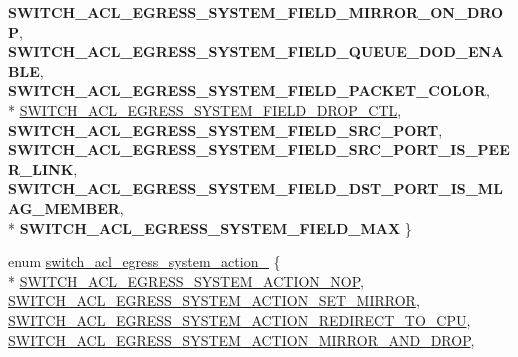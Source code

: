 \begin{DoxyCompactItemize}
{\bfseries S\+W\+I\+T\+C\+H\+\_\+\+A\+C\+L\+\_\+\+E\+G\+R\+E\+S\+S\+\_\+\+S\+Y\+S\+T\+E\+M\+\_\+\+F\+I\+E\+L\+D\+\_\+\+M\+I\+R\+R\+O\+R\+\_\+\+O\+N\+\_\+\+D\+R\+O\+P}, 
{\bfseries S\+W\+I\+T\+C\+H\+\_\+\+A\+C\+L\+\_\+\+E\+G\+R\+E\+S\+S\+\_\+\+S\+Y\+S\+T\+E\+M\+\_\+\+F\+I\+E\+L\+D\+\_\+\+Q\+U\+E\+U\+E\+\_\+\+D\+O\+D\+\_\+\+E\+N\+A\+B\+L\+E}, 
{\bfseries S\+W\+I\+T\+C\+H\+\_\+\+A\+C\+L\+\_\+\+E\+G\+R\+E\+S\+S\+\_\+\+S\+Y\+S\+T\+E\+M\+\_\+\+F\+I\+E\+L\+D\+\_\+\+P\+A\+C\+K\+E\+T\+\_\+\+C\+O\+L\+O\+R}, 
\\*
\hyperlink{group__ACL_gga2edc038cd515df04ca1426513fef2cf0ab4b0d1b005afcb0d88af06b4027ad741}{S\+W\+I\+T\+C\+H\+\_\+\+A\+C\+L\+\_\+\+E\+G\+R\+E\+S\+S\+\_\+\+S\+Y\+S\+T\+E\+M\+\_\+\+F\+I\+E\+L\+D\+\_\+\+D\+R\+O\+P\+\_\+\+C\+T\+L}, 
{\bfseries S\+W\+I\+T\+C\+H\+\_\+\+A\+C\+L\+\_\+\+E\+G\+R\+E\+S\+S\+\_\+\+S\+Y\+S\+T\+E\+M\+\_\+\+F\+I\+E\+L\+D\+\_\+\+S\+R\+C\+\_\+\+P\+O\+R\+T}, 
{\bfseries S\+W\+I\+T\+C\+H\+\_\+\+A\+C\+L\+\_\+\+E\+G\+R\+E\+S\+S\+\_\+\+S\+Y\+S\+T\+E\+M\+\_\+\+F\+I\+E\+L\+D\+\_\+\+S\+R\+C\+\_\+\+P\+O\+R\+T\+\_\+\+I\+S\+\_\+\+P\+E\+E\+R\+\_\+\+L\+I\+N\+K}, 
{\bfseries S\+W\+I\+T\+C\+H\+\_\+\+A\+C\+L\+\_\+\+E\+G\+R\+E\+S\+S\+\_\+\+S\+Y\+S\+T\+E\+M\+\_\+\+F\+I\+E\+L\+D\+\_\+\+D\+S\+T\+\_\+\+P\+O\+R\+T\+\_\+\+I\+S\+\_\+\+M\+L\+A\+G\+\_\+\+M\+E\+M\+B\+E\+R}, 
\\*
{\bfseries S\+W\+I\+T\+C\+H\+\_\+\+A\+C\+L\+\_\+\+E\+G\+R\+E\+S\+S\+\_\+\+S\+Y\+S\+T\+E\+M\+\_\+\+F\+I\+E\+L\+D\+\_\+\+M\+A\+X}
 \}
\item 
enum \hyperlink{group__ACL_ga3f3d6a633ebb6283aad6b971ec96333d}{switch\+\_\+acl\+\_\+egress\+\_\+system\+\_\+action\+\_\+} \{ \\*
\hyperlink{group__ACL_gga3f3d6a633ebb6283aad6b971ec96333dab36d5f148caa50ce3a0c8f335fb9ee1c}{S\+W\+I\+T\+C\+H\+\_\+\+A\+C\+L\+\_\+\+E\+G\+R\+E\+S\+S\+\_\+\+S\+Y\+S\+T\+E\+M\+\_\+\+A\+C\+T\+I\+O\+N\+\_\+\+N\+O\+P}, 
\hyperlink{group__ACL_gga3f3d6a633ebb6283aad6b971ec96333da86ff7792a4ddafc66698e9296d01fb5d}{S\+W\+I\+T\+C\+H\+\_\+\+A\+C\+L\+\_\+\+E\+G\+R\+E\+S\+S\+\_\+\+S\+Y\+S\+T\+E\+M\+\_\+\+A\+C\+T\+I\+O\+N\+\_\+\+S\+E\+T\+\_\+\+M\+I\+R\+R\+O\+R}, 
\hyperlink{group__ACL_gga3f3d6a633ebb6283aad6b971ec96333da6b5d6f6425d47e0f5921e609d8351962}{S\+W\+I\+T\+C\+H\+\_\+\+A\+C\+L\+\_\+\+E\+G\+R\+E\+S\+S\+\_\+\+S\+Y\+S\+T\+E\+M\+\_\+\+A\+C\+T\+I\+O\+N\+\_\+\+R\+E\+D\+I\+R\+E\+C\+T\+\_\+\+T\+O\+\_\+\+C\+P\+U}, 
\hyperlink{group__ACL_gga3f3d6a633ebb6283aad6b971ec96333da19009f91aab371e4983edfbf4bcac773}{S\+W\+I\+T\+C\+H\+\_\+\+A\+C\+L\+\_\+\+E\+G\+R\+E\+S\+S\+\_\+\+S\+Y\+S\+T\+E\+M\+\_\+\+A\+C\+T\+I\+O\+N\+\_\+\+M\+I\+R\+R\+O\+R\+\_\+\+A\+N\+D\+\_\+\+D\+R\+O\+P}, 

\end{DoxyCompactItemize}
